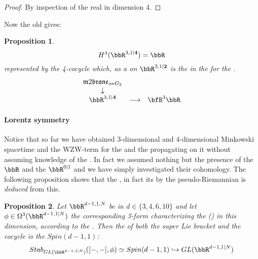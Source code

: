\documentclass[12pt,titlepage]{article}
\newcommand{\itexarray}[1]{\begin{matrix}#1\end{matrix}}
\theoremstyle{plain}
\newtheorem{prop}{Proposition}
\theoremstyle{definition}
\theoremstyle{remark}
\begin{document}
\begin{proof}
By inspection of the real  in dimension 4.
\end{proof}
Now the old  gives:
\begin{prop}
\label{TheStringIn4d}\hypertarget{TheStringIn4d}{}
\begin{displaymath}
H^4(\bbR^{3,1\vert \mathbf{4}}) = \bbR
\end{displaymath}
represented by the 4-cocycle which, as a   on $\bbR^{3,1\vert \mathbf{2}}$ is the  in the  for the .
\begin{displaymath}
\itexarray{
\mathfrak{m}2\mathfrak{brane}_{onG_2}
\\
\downarrow
\\
\bbR^{3,1\vert  \mathbf{4} }
&\stackrel{}{\longrightarrow}&
\bfB^3 \bbR
}
\end{displaymath}
\end{prop}
\hypertarget{lorentz_symmetry}{}\paragraph*{{Lorentz symmetry}}\label{lorentz_symmetry}
Notice that so far we have obtained 3-dimensional and 4-dimensional Minkowski spacetime and the WZW-term for the  and the  propagating on it without assuming knowledge of the . In fact we assumed nothing but the presence of the  $\bbR$ and the  $\bbR^{0|1}$ and we have simply investigated their cohomology.
The following proposition shows that the , in fact its  by the pseudo-Riemannian  is \emph{deduced} from this.
\begin{prop}
\label{StabilizerOfSupersymmetryJointWith3Cocycle}\hypertarget{StabilizerOfSupersymmetryJointWith3Cocycle}{}
Let $\bbR^{d-1,1,N}$ be  in  $d \in \{3,4,6,10\}$ and let $\phi \in \Omega^{3}(\bbR^{d-1,1|N})$ the corresponding 3-form characterizing the  () in this dimension, according to the  . Then the  of both the super Lie bracket and the cocycle is the  $Spin(d-1,1)$:
\begin{displaymath}
Stab_{GL(\bbR^{d-1,1|N})}([-,-], \phi)
\simeq
Spin(d-1,1) \hookrightarrow GL(\bbR^{d-1,1|N})
\end{displaymath}
\end{prop}
\end{document}

